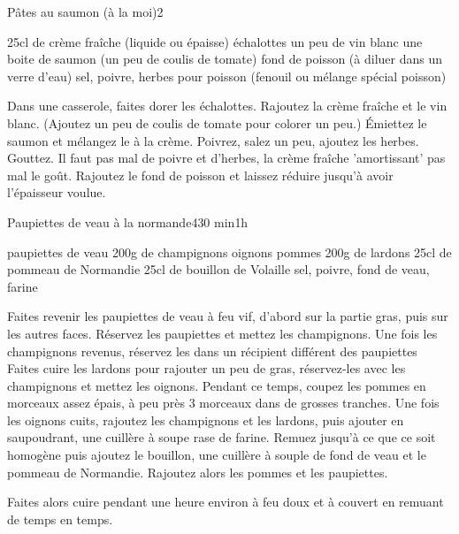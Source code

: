 \begin{recette}{Pâtes au saumon (à la moi)}{2}{}{}
\begin{ingredients}
\ingredient 25cl de crème fraîche (liquide ou épaisse)
 échalottes
\ingredient un peu de vin blanc
\ingredient une boite de saumon
\ingredient (un peu de coulis de tomate)
\ingredient fond de poisson (à diluer dans un verre d'eau)
\ingredient sel, poivre, herbes pour poisson (fenouil ou mélange spécial poisson)
\end{ingredients}

\begin{preparation}
\etape Dans une casserole, faites dorer les échalottes. 
\etape Rajoutez la crème fraîche et le vin blanc. (Ajoutez un peu de coulis de tomate pour colorer un peu.)
\etape Émiettez le saumon et mélangez le à la crème. Poivrez, salez un peu, ajoutez les herbes. Gouttez. Il faut pas mal de poivre et d'herbes, la crème fraîche 'amortissant' pas mal le goût.
\etape Rajoutez le fond de poisson et laissez réduire jusqu'à avoir l'épaisseur voulue.
\end{preparation}

\end{recette}

\begin{recette}{Paupiettes de veau à la normande}{4}{30 min}{1h}
\begin{ingredients}
 paupiettes de veau
\ingredient 200g de champignons
 oignons
 pommes
\ingredient 200g de lardons
\ingredient 25cl de pommeau de Normandie
\ingredient 25cl de bouillon de Volaille
\ingredient sel, poivre, fond de veau, farine
\end{ingredients}

\begin{preparation}
\etape Faites revenir les paupiettes de veau à feu vif, d'abord sur la partie gras, puis sur les autres faces. 
\etape Réservez les paupiettes et mettez les champignons.
\etape Une fois les champignons revenus, réservez les dans un récipient différent des paupiettes
\etape Faites cuire les lardons pour rajouter un peu de gras, réservez-les avec les champignons et mettez les oignons. 
\etape Pendant ce temps, coupez les pommes en morceaux assez épais, à peu près 3 morceaux dans de grosses tranches. 
\etape Une fois les oignons cuits, rajoutez les champignons et les lardons, puis ajouter en saupoudrant, une cuillère à soupe rase de farine. Remuez jusqu'à ce que ce soit homogène puis ajoutez le bouillon, une cuillère à souple de fond de veau et le pommeau de Normandie. 
\etape Rajoutez alors les pommes et les paupiettes.
\end{preparation}

\begin{cuisson}
Faites alors cuire pendant une heure environ à feu doux et à couvert en remuant de temps en temps.
\end{cuisson}


\end{recette}

